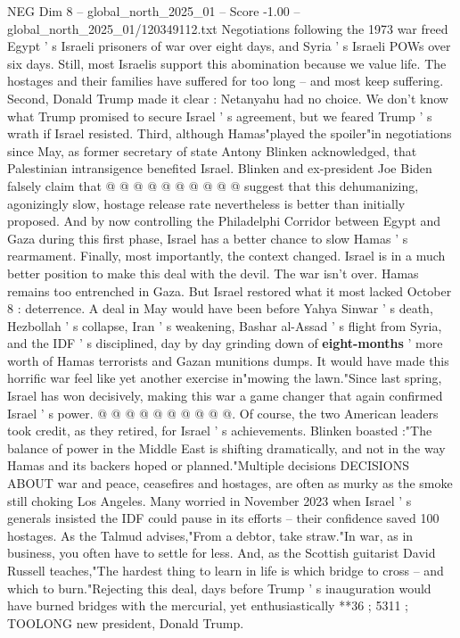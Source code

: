 \begin{textsample}{NEG Dim 8 – global\_north\_2025\_01 – Score -1.00 – global\_north\_2025\_01/120349112.txt}
Negotiations following the 1973 war freed Egypt ' s Israeli prisoners of war over eight days, and Syria ' s Israeli POWs over six days.
Still, most Israelis support this abomination because we value life.
The hostages and their families have suffered for too long -- and most keep suffering.
Second, Donald Trump made it clear : Netanyahu had no choice.
We don't know what Trump promised to secure Israel ' s agreement, but we feared Trump ' s wrath if Israel resisted.
Third, although Hamas"played the spoiler"in negotiations since May, as former secretary of state Antony Blinken acknowledged, that Palestinian intransigence benefited Israel.
Blinken and ex-president Joe Biden falsely claim that @ @ @ @ @ @ @ @ @ @ suggest that this dehumanizing, agonizingly slow, hostage release rate nevertheless is better than initially proposed.
And by now controlling the Philadelphi Corridor between Egypt and Gaza during this first phase, Israel has a better chance to slow Hamas ' s rearmament.
Finally, most importantly, the context changed.
Israel is in a much better position to make this deal with the devil.
The war isn't over.
Hamas remains too entrenched in Gaza.
But Israel restored what it most lacked October 8 : deterrence.
A deal in May would have been before Yahya Sinwar ' s death, Hezbollah ' s collapse, Iran ' s weakening, Bashar al-Assad ' s flight from Syria, and the IDF ' s disciplined, day by day grinding down of \textbf{eight-months} ' more worth of Hamas terrorists and Gazan munitions dumps.
It would have made this horrific war feel like yet another exercise in"mowing the lawn."Since last spring, Israel has won decisively, making this war a game changer that again confirmed Israel ' s power. @ @ @ @ @ @ @ @ @ @.
Of course, the two American leaders took credit, as they retired, for Israel ' s achievements.
Blinken boasted :"The balance of power in the Middle East is shifting dramatically, and not in the way Hamas and its backers hoped or planned."Multiple decisions DECISIONS ABOUT war and peace, ceasefires and hostages, are often as murky as the smoke still choking Los Angeles.
Many worried in November 2023 when Israel ' s generals insisted the IDF could pause in its efforts -- their confidence saved 100 hostages.
As the Talmud advises,"From a debtor, take straw."In war, as in business, you often have to settle for less.
And, as the Scottish guitarist David Russell teaches,"The hardest thing to learn in life is which bridge to cross -- and which to burn."Rejecting this deal, days before Trump ' s inauguration would have burned bridges with the mercurial, yet enthusiastically **36 ; 5311 ; TOOLONG new president, Donald Trump.

\end{textsample}
